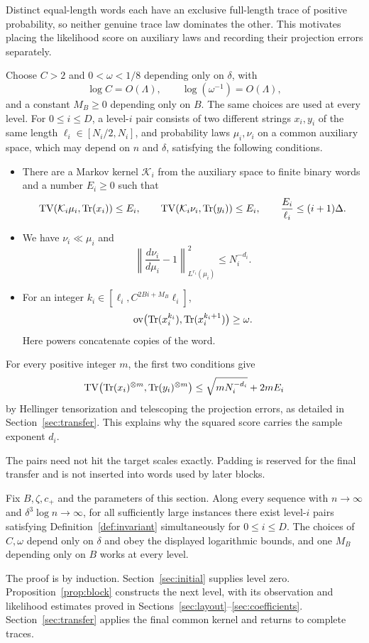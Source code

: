 Distinct equal-length words each have an exclusive full-length trace of positive probability, so neither genuine trace law dominates the other.  This motivates placing the likelihood score on auxiliary laws and recording their projection errors separately.

\begin{definition}\label{def:invariant}
Choose $C>2$ and $0<\omega<1/8$ depending only on $\delta$, with
\[
 \log C=O(\Lambda),\qquad \log(\omega^{-1})=O(\Lambda),
\]
and a constant $M_B\ge0$ depending only on $B$.  The same choices are used at every level.
For $0\le i\le D$, a level-$i$ pair consists of two different strings $x_i,y_i$ of the same length $\ell_i\in[N_i/2,N_i]$, and probability laws $\mu_i,\nu_i$ on a common auxiliary space, which may depend on $n$ and $\delta$, satisfying the following conditions.
\begin{itemize}
\item There are a Markov kernel $\mathcal K_i$ from the auxiliary space to finite binary words and a number $E_i\ge0$ such that
\[
 \operatorname{TV}(\mathcal K_i\mu_i,\mathrm{Tr}(x_i))\le E_i,\qquad
 \operatorname{TV}(\mathcal K_i\nu_i,\mathrm{Tr}(y_i))\le E_i,
 \qquad \frac{E_i}{\ell_i}\le(i+1)\Delta.
\]
\item We have $\nu_i\ll\mu_i$ and
\[
 \left\|\frac{d\nu_i}{d\mu_i}-1\right\|_{L^{r_i}(\mu_i)}^2
       \le N_i^{-d_i}.
\]
\item For an integer $k_i\in[\ell_i,C^{2Bi+M_B}\ell_i]$,
\[
 \operatorname{ov}\bigl(\mathrm{Tr}(x_i^{k_i}),\mathrm{Tr}(x_i^{k_i+1})\bigr)\ge\omega.
\]
Here powers concatenate copies of the word.
\end{itemize}
\end{definition}
For every positive integer $m$, the first two conditions give
\[
 \operatorname{TV}\bigl(\mathrm{Tr}(x_i)^{\otimes m},\mathrm{Tr}(y_i)^{\otimes m}\bigr)
 \le\sqrt{mN_i^{-d_i}}+2mE_i
\]
by Hellinger tensorization and telescoping the projection errors, as detailed in Section~\ref{sec:transfer}.  This explains why the squared score carries the sample exponent $d_i$.

The pairs need not hit the target scales exactly.  Padding is reserved for the final transfer and is not inserted into words used by later blocks.

\begin{proposition}\label{prop:construction}
Fix $B,\zeta,c_+$ and the parameters of this section.  Along every sequence with $n\to\infty$ and $\delta^3\log n\to\infty$, for all sufficiently large instances there exist level-$i$ pairs satisfying Definition~\ref{def:invariant} simultaneously for $0\le i\le D$.  The choices of $C,\omega$ depend only on $\delta$ and obey the displayed logarithmic bounds, and one $M_B$ depending only on $B$ works at every level.
\end{proposition}

The proof is by induction.  Section~\ref{sec:initial} supplies level zero.  Proposition~\ref{prop:block} constructs the next level, with its observation and likelihood estimates proved in Sections~\ref{sec:layout}--\ref{sec:coefficients}.  Section~\ref{sec:transfer} applies the final common kernel and returns to complete traces.
